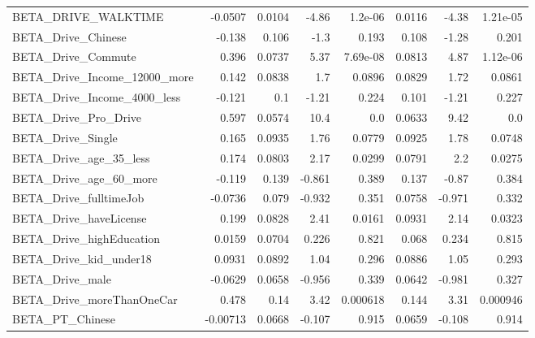 \begin{tabular}{lrrrrrrr}
BETA\_DRIVE\_WALKTIME          &  -0.0507 &   0.0104 &   -4.86 &  1.2e-06 &        0.0116 &        -4.38 &      1.21e-05 \\
BETA\_Drive\_Chinese           &   -0.138 &    0.106 &    -1.3 &    0.193 &         0.108 &        -1.28 &         0.201 \\
BETA\_Drive\_Commute           &    0.396 &   0.0737 &    5.37 & 7.69e-08 &        0.0813 &         4.87 &      1.12e-06 \\
BETA\_Drive\_Income\_12000\_more &    0.142 &   0.0838 &     1.7 &   0.0896 &        0.0829 &         1.72 &        0.0861 \\
BETA\_Drive\_Income\_4000\_less  &   -0.121 &      0.1 &   -1.21 &    0.224 &         0.101 &        -1.21 &         0.227 \\
BETA\_Drive\_Pro\_Drive         &    0.597 &   0.0574 &    10.4 &      0.0 &        0.0633 &         9.42 &           0.0 \\
BETA\_Drive\_Single            &    0.165 &   0.0935 &    1.76 &   0.0779 &        0.0925 &         1.78 &        0.0748 \\
BETA\_Drive\_age\_35\_less       &    0.174 &   0.0803 &    2.17 &   0.0299 &        0.0791 &          2.2 &        0.0275 \\
BETA\_Drive\_age\_60\_more       &   -0.119 &    0.139 &  -0.861 &    0.389 &         0.137 &        -0.87 &         0.384 \\
BETA\_Drive\_fulltimeJob       &  -0.0736 &    0.079 &  -0.932 &    0.351 &        0.0758 &       -0.971 &         0.332 \\
BETA\_Drive\_haveLicense       &    0.199 &   0.0828 &    2.41 &   0.0161 &        0.0931 &         2.14 &        0.0323 \\
BETA\_Drive\_highEducation     &   0.0159 &   0.0704 &   0.226 &    0.821 &         0.068 &        0.234 &         0.815 \\
BETA\_Drive\_kid\_under18       &   0.0931 &   0.0892 &    1.04 &    0.296 &        0.0886 &         1.05 &         0.293 \\
BETA\_Drive\_male              &  -0.0629 &   0.0658 &  -0.956 &    0.339 &        0.0642 &       -0.981 &         0.327 \\
BETA\_Drive\_moreThanOneCar    &    0.478 &     0.14 &    3.42 & 0.000618 &         0.144 &         3.31 &      0.000946 \\
BETA\_PT\_Chinese              & -0.00713 &   0.0668 &  -0.107 &    0.915 &        0.0659 &       -0.108 &         0.914 \\

\end{tabular}
